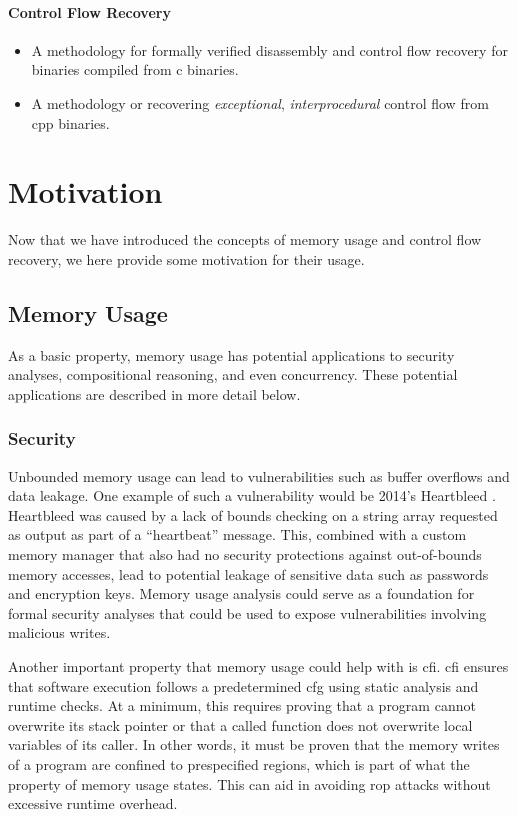 \paragraph{Control Flow Recovery}
\begin{itemize}
  \item A methodology for formally verified disassembly and control flow recovery for binaries compiled from \gls{c} binaries.
  \item A methodology or recovering \emph{exceptional}, \emph{interprocedural} control flow from \gls{cpp} binaries.
\end{itemize}

\section{Motivation}
Now that we have introduced the concepts of memory usage and control flow recovery, we here provide some motivation for their usage.

\subsection{Memory Usage}
As a basic property, memory usage has potential applications to security analyses, compositional reasoning, and even concurrency.
These potential applications are described in more detail below.

\subsubsection{Security}
Unbounded memory usage can lead to vulnerabilities such as buffer overflows and data leakage.
One example of such a vulnerability would be 2014's Heartbleed \autocite{heartbleed}.
Heartbleed was caused by a lack of bounds checking on a string array requested as output as part of a ``heartbeat'' message.
This, combined with a custom memory manager that also had no security protections against out-of-bounds memory accesses, lead to potential leakage of sensitive data such as passwords and encryption keys.
Memory usage analysis could serve as a foundation for formal security analyses that could be used to expose vulnerabilities involving malicious writes.

Another important property that memory usage could help with is \ac{cfi}.
\Ac{cfi} ensures that software execution follows a predetermined \ac{cfg} using static analysis and runtime checks.
At a minimum, this requires proving that a program cannot overwrite its stack pointer or that a called function does not overwrite local variables of its caller.
In other words, it must be proven that the memory writes of a program are confined to prespecified regions, which is part of what the property of memory usage states.
This can aid in avoiding \ac{rop} attacks without excessive runtime overhead.

